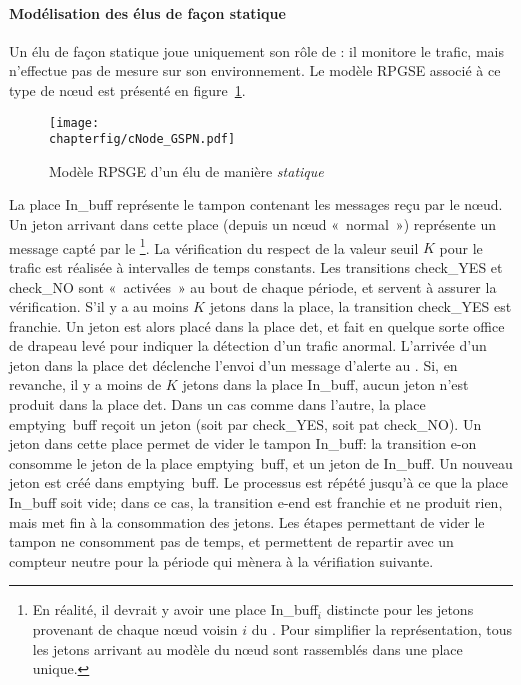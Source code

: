             \paragraph{Modélisation des \cns élus de façon statique}
Un \cn élu de façon statique joue uniquement son rôle de \cn: il monitore le trafic, mais n'effectue pas de mesure sur son environnement.
Le modèle RPGSE associé à ce type de nœud est présenté en figure~\ref{sa:fig:cnodegspn1}.
\begin{figure}[H]
    \centering
    \texttt{[image: \\chapterfig/cNode\_GSPN.pdf]}
    \caption{Modèle RPSGE d'un \cn élu de manière \emph{statique}}\label{sa:fig:cnodegspn1}
\end{figure}
La place \textsf{In\_buff} représente le tampon contenant les messages reçu par le nœud.
Un jeton arrivant dans cette place (depuis un nœud «~normal~») représente un message capté par le \cn\footnote{En réalité, il devrait y avoir une place \textsf{In\_buff$_i$} distincte pour les jetons provenant de chaque nœud voisin $i$ du \cn. Pour simplifier la représentation, tous les jetons arrivant au modèle du nœud sont rassemblés dans une place unique.}.
La vérification du respect de la valeur seuil $K$ pour le trafic est réalisée à intervalles de temps constants.
Les transitions \textsf{check\_YES} et \textsf{check\_NO} sont «~activées~» au bout de chaque période, et servent à assurer la vérification.
S'il y a au moins $K$ jetons dans la place, la transition \textsf{check\_YES} est franchie.
Un jeton est alors placé dans la place \textsf{det}, et fait en quelque sorte office de drapeau levé pour indiquer la détection d'un trafic anormal.
L'arrivée d'un jeton dans la place \textsf{det} déclenche l'envoi d'un message d'alerte au \ch.
Si, en revanche, il y a moins de $K$ jetons dans la place \textsf{In\_buff}, aucun jeton n'est produit dans la place \textsf{det}.
Dans un cas comme dans l'autre, la place \textsf{emptying~buff} reçoit un jeton (soit par \textsf{check\_YES}, soit pat \textsf{check\_NO}).
Un jeton dans cette place permet de vider le tampon \textsf{In\_buff}: la transition \textsf{e-on} consomme le jeton de la place \textsf{emptying~buff}, et un jeton de \textsf{In\_buff}.
Un nouveau jeton est créé dans \textsf{emptying~buff}.
Le processus est répété jusqu'à ce que la place \textsf{In\_buff} soit vide; dans ce cas, la transition \textsf{e-end} est franchie et ne produit rien, mais met fin à la consommation des jetons.
Les étapes permettant de vider le tampon ne consomment pas de temps, et permettent de repartir avec un compteur neutre pour la période qui mènera à la vérifiation suivante.

